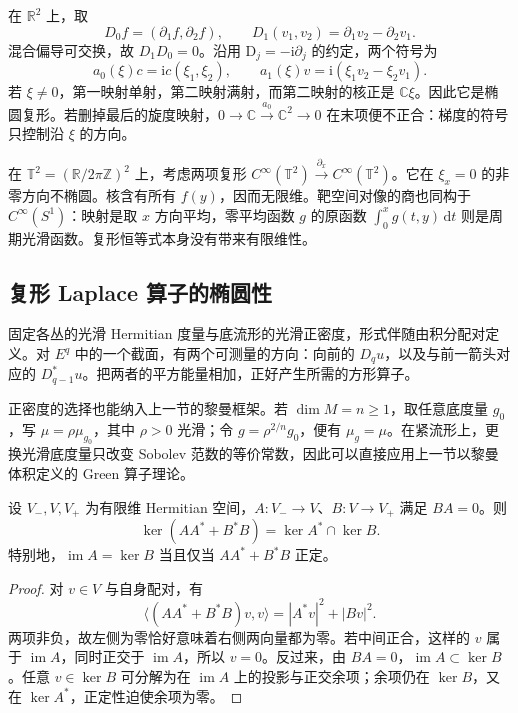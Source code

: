 \begin{example}\label{g3:exm:gradient-curl-symbol-complex}
	在 \(\mathbb R^2\) 上，取
	\[
		D_0f=(\partial_1f,\partial_2f),\qquad
		D_1(v_1,v_2)=\partial_1v_2-\partial_2v_1.
	\]
	混合偏导可交换，故 \(D_1D_0=0\)。沿用 \(\mathrm D_j=-\mathrm i\partial_j\) 的约定，两个符号为
	\[
		a_0(\xi)c=\mathrm i c(\xi_1,\xi_2),\qquad
		a_1(\xi)v=\mathrm i(\xi_1v_2-\xi_2v_1).
	\]
	若 \(\xi\ne0\)，第一映射单射，第二映射满射，而第二映射的核正是 \(\mathbb C\xi\)。因此它是椭圆复形。若删掉最后的旋度映射，\(0\to\mathbb C\xrightarrow{a_0}\mathbb C^2\to0\) 在末项便不正合：梯度的符号只控制沿 \(\xi\) 的方向。
\end{example}

\begin{example}\label{g3:exm:nonelliptic-complex-infinite-cohomology}
	在 \(\mathbb T^2=(\mathbb R/2\pi\mathbb Z)^2\) 上，考虑两项复形 \(C^\infty(\mathbb T^2)\xrightarrow{\partial_x}C^\infty(\mathbb T^2)\)。它在 \(\xi_x=0\) 的非零方向不椭圆。核含有所有 \(f(y)\)，因而无限维。靶空间对像的商也同构于 \(C^\infty(S^1)\)：映射是取 \(x\) 方向平均，零平均函数 \(g\) 的原函数 \(\int_0^x g(t,y)\,\mathrm dt\) 则是周期光滑函数。复形恒等式本身没有带来有限维性。
\end{example}

\subsection{复形 Laplace 算子的椭圆性}
\label{g3:subsec:1304:02}
固定各丛的光滑 Hermitian 度量与底流形的光滑正密度，形式伴随由积分配对定义。对 \(E^q\) 中的一个截面，有两个可测量的方向：向前的 \(D_qu\)，以及与前一箭头对应的 \(D_{q-1}^*u\)。把两者的平方能量相加，正好产生所需的方形算子。

\ProseParagraphBreak

正密度的选择也能纳入上一节的黎曼框架。若 \(\dim M=n\ge1\)，取任意底度量 \(g_0\)，写 \(\mu=\rho\mu_{g_0}\)，其中 \(\rho>0\) 光滑；令 \(g=\rho^{2/n}g_0\)，便有 \(\mu_g=\mu\)。在紧流形上，更换光滑底度量只改变 Sobolev 范数的等价常数，因此可以直接应用上一节以黎曼体积定义的 Green 算子理论。

\begin{lemma}\label{g3:lem:complex-symbol-laplacian}
	设 \(V_-,V,V_+\) 为有限维 Hermitian 空间，\(A:V_-\to V\)、\(B:V\to V_+\) 满足 \(BA=0\)。则
	\[
		\ker(AA^*+B^*B)=\ker A^*\cap\ker B.
	\]
	特别地，\(\operatorname{im}A=\ker B\) 当且仅当 \(AA^*+B^*B\) 正定。
\end{lemma}
\begin{proof}
	对 \(v\in V\) 与自身配对，有
	\[
		\langle(AA^*+B^*B)v,v\rangle=|A^*v|^2+|Bv|^2.
	\]
	两项非负，故左侧为零恰好意味着右侧两向量都为零。若中间正合，这样的 \(v\) 属于 \(\operatorname{im}A\)，同时正交于 \(\operatorname{im}A\)，所以 \(v=0\)。反过来，由 \(BA=0\)，\(\operatorname{im}A\subset\ker B\)。任意 \(v\in\ker B\) 可分解为在 \(\operatorname{im}A\) 上的投影与正交余项；余项仍在 \(\ker B\)，又在 \(\ker A^*\)，正定性迫使余项为零。
\end{proof}

